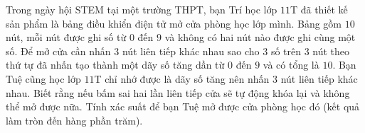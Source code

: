 \begin{ex}%
	Trong ngày hội STEM tại một trường THPT, bạn Trí học lớp $11$T đã thiết kế sản phẩm là bảng điều khiển điện tử mở cửa phòng học lớp mình. Bảng gồm $10$ nút, mỗi nút được ghi số từ $0$ đến $9$ và không có hai nút nào được ghi cùng một số. Để mở cửa cần nhấn $3$ nút liên tiếp khác nhau sao cho $3$ số trên $3$ nút theo thứ tự đã nhấn tạo thành một dãy số tăng dần từ $0$ đến $9$ và có tổng là $10$. Bạn Tuệ cũng học lớp $11$T chỉ nhớ được là dãy số tăng nên nhấn $3$ nút liên tiếp khác nhau. Biết rằng nếu bấm sai hai lần liên tiếp cửa sẽ tự động khóa lại và không thể mở được nữa. Tính xác suất để bạn Tuệ mở được cửa phòng học đó (kết quả làm tròn đến hàng phần trăm).
\end{ex}

